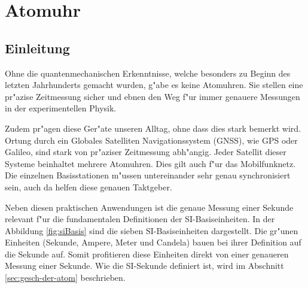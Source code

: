 \chapter{Atomuhr\label{chapter:atomuhr}}
\begin{refsection}

\section{Einleitung}
%

Ohne die quantenmechanischen Erkenntnisse, welche besonders zu Beginn
des letzten Jahrhunderts gemacht wurden, g"abe es keine Atomuhren.
Sie stellen eine pr"azise Zeitmessung sicher und ebnen den Weg f"ur
immer genauere Messungen in der experimentellen Physik.
%

Zudem pr"agen diese Ger"ate unseren Alltag, ohne dass dies stark
bemerkt wird.  Ortung durch ein Globales Satelliten Navigationssystem
(GNSS), wie GPS oder Galileo, sind stark von pr"aziser Zeitmessung
%
%
abh"angig.  Jeder Satellit dieser Systeme beinhaltet mehrere
Atomuhren.  Dies gilt auch f"ur das Mobilfunknetz. Die einzelnen
%
Basisstationen m"ussen untereinander sehr genau synchronisiert sein,
auch da helfen diese genauen Taktgeber.

Neben diesen praktischen Anwendungen ist die genaue Messung einer
Sekunde relevant f"ur die fundamentalen Definitionen der
SI-Basiseinheiten. In der Abbildung \ref{fig:siBasis} sind die sieben
SI-Basis\-ein\-hei\-ten dargestellt.  Die gr"unen Einheiten (Sekunde,
Ampere, Meter und Candela) bauen bei ihrer Definition auf die Sekunde
auf.  Somit profitieren diese Einheiten direkt von einer genaueren
Messung einer Sekunde.  Wie die SI-Sekunde definiert ist, wird im
Abschnitt \ref{sec:gesch-der-atom} beschrieben.

\begin{figure}
  \centering
\end{figure}
\end{refsection}
